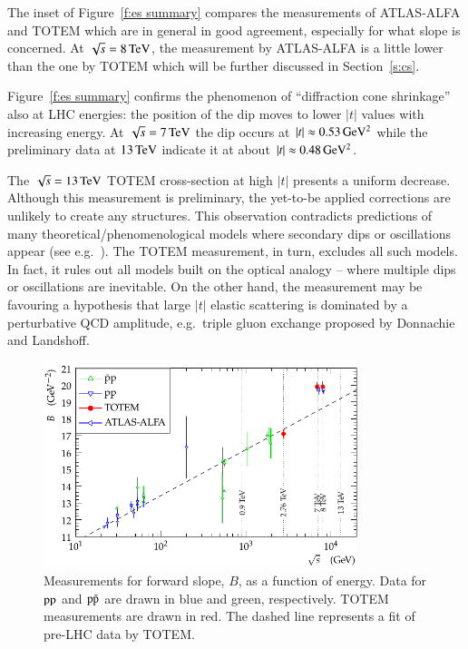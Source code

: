 \documentclass{webofc}
\def\un#1{\,{\rm #1}}
\begin{document}
The inset of Figure~\ref{f:es summary} compares the measurements of ATLAS-ALFA and TOTEM which are in general in good agreement, especially for what slope is concerned. At $\sqrt s = 8\un{TeV}$, the measurement by ATLAS-ALFA is a little lower than the one by TOTEM which will be further discussed in Section~\ref{s:cs}.

Figure~\ref{f:es summary} confirms the phenomenon of ``diffraction cone shrinkage'' also at LHC energies: the position of the dip moves to lower $|t|$ values with increasing energy. At $\sqrt s = 7\un{TeV}$ the dip occurs at $|t| \approx 0.53\un{GeV^2}$ while the preliminary data at $13\un{TeV}$ indicate it at about $|t| \approx 0.48\un{GeV^2}$.

The $\sqrt s = 13\un{TeV}$ TOTEM cross-section at high $|t|$ presents a uniform decrease. Although this measurement is preliminary, the yet-to-be applied corrections are unlikely to create any structures. This observation contradicts predictions of many theoretical/phenomenological models where secondary dips or oscillations appear (see e.g.~\cite{elegent}). The TOTEM measurement, in turn, excludes all such models. In fact, it rules out all models built on the optical analogy -- where multiple dips or oscillations are inevitable. On the other hand, the measurement may be favouring a hypothesis that large $|t|$ elastic scattering is dominated by a perturbative QCD amplitude, e.g.~triple gluon exchange proposed by Donnachie and Landshoff.

\begin{figure}[h]
\centering
\includegraphics[height=6cm,clip]{fig/es_B_vs_s.pdf}
\vskip-4mm
\caption{Measurements for forward slope, $B$, as a function of energy. Data for $\rm pp$ and $\rm p\bar p$ are drawn in blue and green, respectively. TOTEM measurements are drawn in red. The dashed line represents a fit of pre-LHC data \cite{b-vs-s-data} by TOTEM.}
\label{f:es B}
\end{figure}
\end{document}
